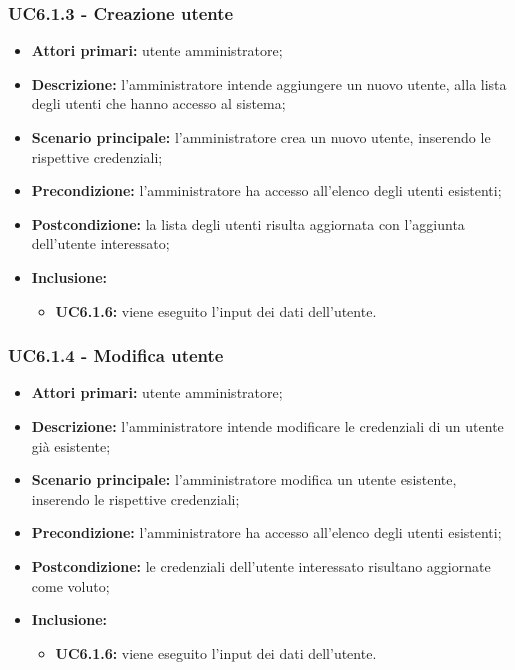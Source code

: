 \subsubsection{UC6.1.3 - Creazione utente}
	\begin{itemize}
		\item \textbf{Attori primari:} utente amministratore;
		\item \textbf{Descrizione:} l'amministratore intende aggiungere un nuovo utente, alla lista degli utenti che hanno accesso al sistema;
		\item \textbf{Scenario principale:} l'amministratore crea un nuovo utente, inserendo le rispettive credenziali;
		\item \textbf{Precondizione:} l'amministratore ha accesso all'elenco degli utenti esistenti;
		\item \textbf{Postcondizione:} la lista degli utenti risulta aggiornata con l'aggiunta dell'utente interessato;
		\item \textbf{Inclusione:} 
		\begin{itemize}
			\item \textbf{UC6.1.6:} viene eseguito l'input dei dati dell'utente.
		\end{itemize}
	\end{itemize}

\subsubsection{UC6.1.4 - Modifica utente}
	\begin{itemize}
		\item \textbf{Attori primari:} utente amministratore;
		\item \textbf{Descrizione:} l'amministratore intende modificare le credenziali di un utente già esistente;
		\item \textbf{Scenario principale:} l'amministratore modifica un utente esistente, inserendo le rispettive credenziali;
		\item \textbf{Precondizione:} l'amministratore ha accesso all'elenco degli utenti esistenti;
		\item \textbf{Postcondizione:} le credenziali dell'utente interessato risultano aggiornate come voluto;
		\item \textbf{Inclusione:} 
		\begin{itemize}
			\item \textbf{UC6.1.6:} viene eseguito l'input dei dati dell'utente.
		\end{itemize}
	\end{itemize}

